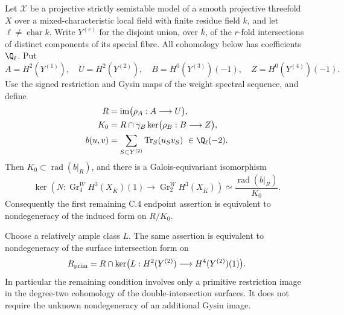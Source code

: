 \begin{proposition}
\label{c:threefold-pairing-kernel}
Let $\mathcal X$ be a projective strictly semistable model of a smooth
projective threefold $X$ over a mixed-characteristic local field with
finite residue field $k$, and let $\ell\ne\operatorname{char}k$.
Write $Y^{(r)}$ for the disjoint union, over $\bar k$, of the
$r$-fold intersections of distinct components of its special fibre.
All cohomology below has coefficients $\Q_\ell$.  Put
\[
 A=H^2(Y^{(1)}),\quad U=H^2(Y^{(2)}),\quad
 B=H^0(Y^{(3)})(-1),\quad Z=H^0(Y^{(4)})(-1).
\]
Use the signed restriction and Gysin maps of the weight spectral
sequence, and define
\[
 \begin{split}
 R&=\operatorname{im}\bigl(\rho_A:A\longrightarrow U\bigr),\\
 K_0&=R\cap\gamma_B
       \ker\bigl(\rho_B:B\longrightarrow Z\bigr),\\
 b(u,v)&=\sum_{S\subset Y^{(2)}}\operatorname{Tr}_S(u_Sv_S)
           \ \in\Q_\ell(-2).
 \end{split}
\]
Then $K_0\subset\operatorname{rad}(b|_R)$, and there is a
Galois-equivariant isomorphism
\begin{equation}
\label{eq:c-threefold-radical-kernel}
 \ker\!\left(
 N:\operatorname{Gr}^W_4H^3(X_{\bar K})(1)
       \longrightarrow\operatorname{Gr}^W_2H^3(X_{\bar K})
 \right)
 \simeq
 \frac{\operatorname{rad}(b|_R)}{K_0}.
\end{equation}
Consequently the first remaining C.4 endpoint assertion is equivalent
to nondegeneracy of the induced form on $R/K_0$.

Choose a relatively ample class $L$.  The same assertion is
equivalent to nondegeneracy of the surface intersection form on
\begin{equation}
\label{eq:c-threefold-primitive-image}
 R_{\rm prim}
 =R\cap
   \ker\bigl(
       L:H^2(Y^{(2)})\longrightarrow H^4(Y^{(2)})(1)
       \bigr).
\end{equation}
In particular the remaining condition involves only a primitive
restriction image in the degree-two cohomology of the
double-intersection surfaces.  It does not require the unknown
nondegeneracy of an additional Gysin image.
\end{proposition}

